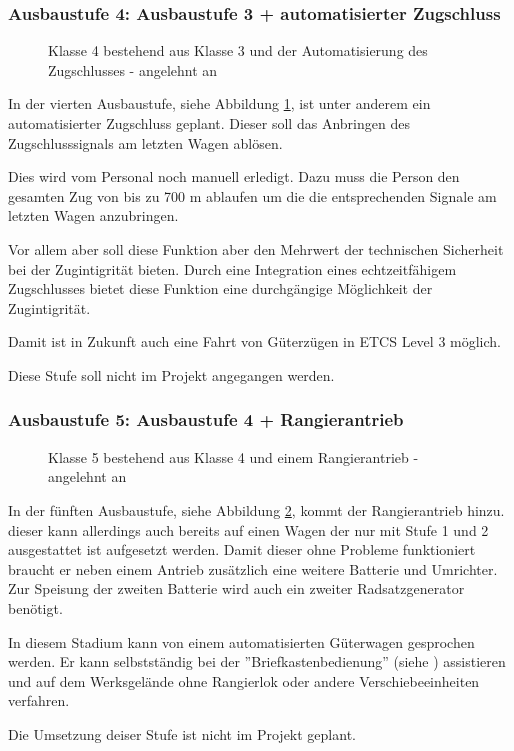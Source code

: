 \subsubsection{Ausbaustufe 4: Ausbaustufe 3 + automatisierter Zugschluss}
\begin{figure}[htbp] 
    
    \caption{Klasse 4 bestehend aus Klasse 3 und der Automatisierung des Zugschlusses - angelehnt an \cite{ETR_3}}
    \label{fig:Klasse4}
\end{figure} 
In der vierten Ausbaustufe, siehe Abbildung \ref{fig:Klasse4}, ist unter anderem ein automatisierter Zugschluss geplant. Dieser soll das Anbringen des Zugschlusssignals am letzten Wagen ablösen.\par
Dies wird vom Personal noch manuell erledigt. Dazu muss die Person den gesamten Zug von bis zu 700 m ablaufen um die die entsprechenden Signale am letzten Wagen anzubringen.\par
Vor allem aber soll diese Funktion aber den Mehrwert der technischen Sicherheit bei der Zugintigrität bieten. Durch eine Integration eines echtzeitfähigem Zugschlusses bietet diese Funktion eine durchgängige Möglichkeit der Zugintigrität.\par
Damit ist in Zukunft auch eine Fahrt von Güterzügen in ETCS Level 3 möglich.\par
Diese Stufe soll nicht im Projekt angegangen werden.

\subsubsection{Ausbaustufe 5: Ausbaustufe 4 + Rangierantrieb} \label{sec:A5}
\begin{figure}[htbp] 
    
    \caption{Klasse 5 bestehend aus Klasse 4 und einem Rangierantrieb - angelehnt an \cite{ETR_3}}
    \label{fig:Klasse5}
\end{figure}
In der fünften Ausbaustufe, siehe Abbildung \ref{fig:Klasse5}, kommt der Rangierantrieb hinzu. dieser kann allerdings auch bereits auf einen Wagen der nur mit Stufe 1 und 2 ausgestattet ist aufgesetzt werden. Damit dieser ohne Probleme funktioniert braucht er neben einem Antrieb zusätzlich eine weitere Batterie und Umrichter. Zur Speisung der zweiten Batterie wird auch ein zweiter Radsatzgenerator benötigt.\par
In diesem Stadium kann von einem automatisierten Güterwagen gesprochen werden. Er kann selbstständig bei der ''Briefkastenbedienung'' (siehe \cite{GAK}) assistieren und auf dem Werksgelände ohne Rangierlok oder andere Verschiebeeinheiten verfahren.\par
Die Umsetzung deiser Stufe ist nicht im Projekt geplant.


